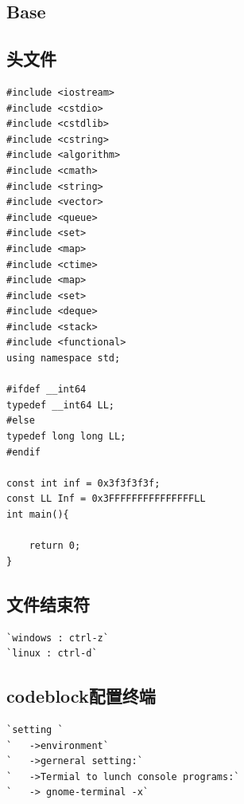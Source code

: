 \documentclass[a4paper]{article}
\begin{document}
\begin{CJK*}{UTF8}{gbsn}
\begin{multicols}{3}

\renewcommand{\contentsname}{目录}

\tableofcontents

\clearpage 



\begin{flushleft} 

% 
%
% 
%


\section{Base}
\subsection{头文件}
\begin{lstlisting}
#include <iostream>
#include <cstdio>
#include <cstdlib>
#include <cstring>
#include <algorithm>
#include <cmath>
#include <string>
#include <vector>
#include <queue>
#include <set>
#include <map>
#include <ctime>
#include <map>
#include <set>
#include <deque>
#include <stack>
#include <functional>
using namespace std;

#ifdef __int64
typedef __int64 LL;
#else
typedef long long LL;
#endif

const int inf = 0x3f3f3f3f;
const LL Inf = 0x3FFFFFFFFFFFFFFFLL
int main(){

    return 0;
}
\end{lstlisting}

\subsection{文件结束符}
\begin{lstlisting}
`windows : ctrl-z`
`linux : ctrl-d`
\end{lstlisting}

\subsection{codeblock配置终端}
\begin{lstlisting}
`setting `
`	->environment`
`	->gerneral setting:`
`	->Termial to lunch console programs:`
`	-> gnome-terminal -x`
\end{lstlisting}


\end{flushleft}
\end{multicols}
\end{CJK*}
\end{document}

